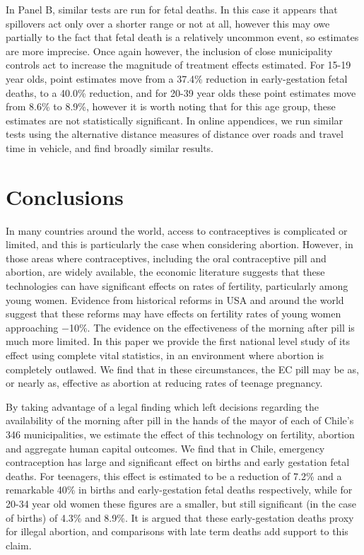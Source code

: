 In Panel B, similar tests are run for fetal deaths.  In this case it appears 
that spillovers act only over a shorter range or not at all, however this may 
owe partially to the fact that fetal death is a relatively uncommon event, so 
estimates are more imprecise.  Once again however, the inclusion of close 
municipality controls act to increase the magnitude of treatment effects 
estimated.  For 15-19 year olds, point estimates move from a 37.4\% reduction 
in early-gestation fetal deaths, to a 40.0\% reduction, and for 20-39 year olds
these point estimates move from 8.6\% to 8.9\%, however it is worth noting 
that for this age group, these estimates are not statistically significant.
In online appendices, we run similar tests using the alternative distance 
measures of distance over roads and travel time in vehicle, and find broadly
similar results.

\section{Conclusions}
\label{TEENscn:conclusion}
In many countries around the world, access to contraceptives is complicated or
limited, and this is particularly the case when considering abortion.  However,
in those areas where contraceptives, including the oral contraceptive pill and 
abortion, are widely available, the economic literature suggests that these
technologies can have significant effects on rates of fertility, particularly
among young women.  Evidence from historical reforms in USA and around the world
suggest that these reforms may have effects on fertility rates of young women 
approaching $-$10\%.  The evidence on the effectiveness of the morning after pill 
is much more limited.  In this paper we provide the first national level study of 
its effect using complete vital statistics, in an environment where abortion is 
completely outlawed. We find that in these circumstances, the EC pill may be as, 
or nearly as, effective as abortion at reducing rates of teenage pregnancy.

By taking advantage of a legal finding which left decisions regarding the 
availability of the morning after pill in the hands of the mayor of each of
Chile's 346 municipalities, we estimate the effect of this technology on 
fertility, abortion and aggregate human capital outcomes. We find that in Chile,
emergency contraception has large and significant effect on births and early 
gestation fetal deaths.  For teenagers, this effect is estimated to be a
reduction of 7.2\% and a remarkable 40\% in births and early-gestation fetal 
deaths respectively, while for 20-34 year old women these figures are a smaller, 
but still significant (in the case of births) of 4.3\% and 8.9\%.  It is argued 
that these early-gestation deaths proxy for illegal abortion, and comparisons 
with late term deaths add support to this claim.

